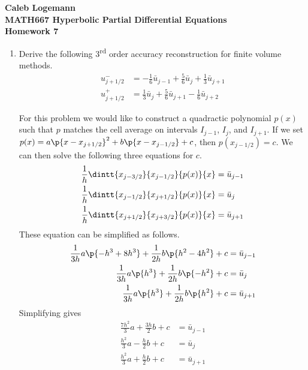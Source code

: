 \documentclass[11pt, oneside]{article}
\begin{document}
\noindent \textbf{\Large{Caleb Logemann \\
MATH667 Hyperbolic Partial Differential Equations \\
Homework 7
}}

%
\begin{enumerate}
    \item %
      Derive the following 3\textsuperscript{rd} order accuracy reconstruction
      for finite volume methods.
      \begin{align*}
        u_{j+1/2}^- &= -\frac{1}{6} \bar{u}_{j-1} + \frac{5}{6}\bar{u}_j + \frac{1}{3}\bar{u}_{j+1} \\
        u_{j+1/2}^+ &= \frac{1}{3} \bar{u}_{j} + \frac{5}{6}\bar{u}_{j+1} - \frac{1}{6}\bar{u}_{j+2}
      \end{align*}

      For this problem we would like to construct a quadractic polynomial $p(x)$
      such that $p$ matches the cell average on intervals $I_{j-1}$, $I_j$, and
      $I_{j+1}$.
      If we set
      $p(x) = a\p{x - x_{j+1/2}}^2 + b\p{x - x_{j-1/2}} + c$, then
      $p(x_{j-1/2}) = c$.
      We can then solve the following three equations for $c$.
      \begin{align*}
        \frac{1}{h} \dintt{x_{j-3/2}}{x_{j-1/2}}{p(x)}{x} &= \bar{u}_{j-1} \\
        \frac{1}{h} \dintt{x_{j-1/2}}{x_{j+1/2}}{p(x)}{x} &= \bar{u}_{j} \\
        \frac{1}{h} \dintt{x_{j+1/2}}{x_{j+3/2}}{p(x)}{x} &= \bar{u}_{j+1}
      \end{align*}
      These equation can be simplified as follows.
      \begin{align*}
        \frac{1}{3h}a \p{-h^3 + 8h^3} + \frac{1}{2h}b\p{h^2 - 4h^2} + c &= \bar{u}_{j-1} \\
        \frac{1}{3h}a \p{h^3} + \frac{1}{2h}b\p{-h^2} + c &= \bar{u}_{j} \\
        \frac{1}{3h}a \p{h^3} + \frac{1}{2h}b\p{h^2} + c &= \bar{u}_{j+1}
      \end{align*}
      Simplifying gives
      \begin{align*}
        \frac{7h^2}{3}a + \frac{3h}{2}b + c &= \bar{u}_{j-1} \\
        \frac{h^2}{3}a - \frac{h}{2}b + c &= \bar{u}_{j} \\
        \frac{h^2}{3}a + \frac{h}{2}b + c &= \bar{u}_{j+1}
      \end{align*}


\end{enumerate}
\end{document}
